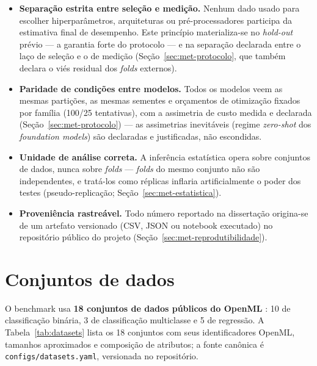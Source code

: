 \begin{itemize}
  \item \textbf{Separação estrita entre seleção e medição.} Nenhum dado
    usado para escolher hiperparâmetros, arquiteturas ou pré-processadores
    participa da estimativa final de desempenho. Este princípio materializa-se
    no \emph{hold-out} prévio --- a garantia forte do protocolo --- e na
    separação declarada entre o laço de seleção e o de medição
    (Seção~\ref{sec:met-protocolo}, que também declara o viés residual
    dos \emph{folds} externos).
  \item \textbf{Paridade de condições entre modelos.} Todos os modelos veem
    as mesmas partições, as mesmas sementes e orçamentos de otimização
    fixados por família (100/25 tentativas), com a assimetria de custo
    medida e declarada (Seção~\ref{sec:met-protocolo}) --- as assimetrias inevitáveis (regime
    \emph{zero-shot} dos \emph{foundation models}) são declaradas e
    justificadas, não escondidas.
  \item \textbf{Unidade de análise correta.} A inferência estatística opera
    sobre conjuntos de dados, nunca sobre \emph{folds} --- \emph{folds} do
    mesmo conjunto não são independentes, e tratá-los como réplicas inflaria
    artificialmente o poder dos testes (pseudo-replicação;
    Seção~\ref{sec:met-estatistica}).
  \item \textbf{Proveniência rastreável.} Todo número reportado na
    dissertação origina-se de um artefato versionado (CSV, JSON ou notebook
    executado) no repositório público do projeto
    (Seção~\ref{sec:met-reprodutibilidade}).
\end{itemize}

\section{Conjuntos de dados}
\label{sec:met-datasets}

O benchmark usa \textbf{18 conjuntos de dados públicos do OpenML}
\citep{vanschoren2014}: 10 de classificação binária, 3 de classificação
multiclasse e 5 de regressão. A Tabela~\ref{tab:datasets} lista os 18
conjuntos com seus identificadores OpenML, tamanhos aproximados e composição
de atributos; a fonte canônica é \texttt{configs/\allowbreak datasets.\allowbreak yaml}, versionada
no repositório.

